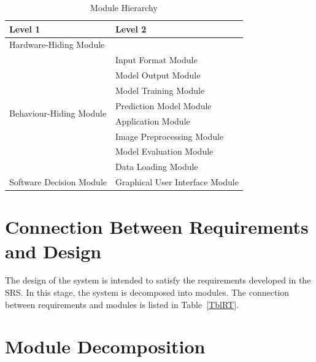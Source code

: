 \documentclass[12pt, titlepage]{article}
\begin{document}
\begin{table}[h!]
\centering
\begin{tabular}{p{} p{}}
\toprule
\textbf{Level 1} & \textbf{Level 2}\\
\midrule

{Hardware-Hiding Module} & ~ \\
\midrule

\multirow{8}{0.3\textwidth}{Behaviour-Hiding Module} &
Input Format Module\\
& Model Output Module\\
& Model Training Module\\
& Prediction Model Module\\
& Application Module\\
& Image Preprocessing Module\\
& Model Evaluation Module\\
& Data Loading Module\\
\midrule

\multirow{1}{0.3\textwidth}{Software Decision Module}&
Graphical User Interface Module\\
\bottomrule

\end{tabular}
\caption{Module Hierarchy}
\label{TblMH}
\end{table}

\section{Connection Between Requirements and Design} \label{SecConnection}

The design of the system is intended to satisfy the requirements developed in
the SRS. In this stage, the system is decomposed into modules. The connection
between requirements and modules is listed in Table~\ref{TblRT}.


\section{Module Decomposition} \label{SecMD}
\end{document}
